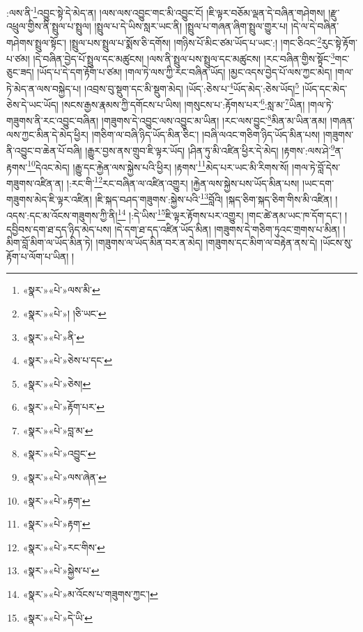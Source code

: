 :ལས་ནི་\footnote{«སྣར་»«པེ་»ལས་མི་}འབྱུང་སྟེ་དེ་མེད་ན། །ལས་ལས་འབྱུང་གང་མི་འབྱུང་ངོ། །ཇི་ལྟར་བཅོམ་ལྡན་དེ་བཞིན་གཤེགས། །རྫུ་འཕྲུལ་གྱིས་ནི་སྤྲུལ་པ་སྤྲུལ། །སྤྲུལ་པ་དེ་ཡིས་སླར་ཡང་ནི། །སྤྲུལ་པ་གཞན་ཞིག་སྤྲུལ་གྱུར་པ། །དེ་ལ་དེ་བཞིན་གཤེགས་སྤྲུལ་སྟོང་། །སྤྲུལ་པས་སྤྲུལ་པ་སྨོས་ཅི་དགོས། །གཉིས་པོ་མིང་ཙམ་ཡོད་པ་ཡང་:། །གང་ཅིའང་\footnote{«སྣར་»«པེ་»། །ཅི་ཡང་}རུང་སྟེ་རྟོག་པ་ཙམ། །དེ་བཞིན་བྱེད་པོ་སྤྲུལ་དང་མཚུངས། །ལས་ནི་སྤྲུལ་པས་སྤྲུལ་དང་མཚུངས། །རང་བཞིན་གྱིས་སྟོང་\footnote{«སྣར་»«པེ་»ནི་}གང་ཅུང་ཟད། །ཡོད་པ་དེ་དག་རྟོག་པ་ཙམ། །གལ་ཏེ་ལས་ཀྱི་རང་བཞིན་ཡོད། །མྱང་འདས་བྱེད་པོ་ལས་ཀྱང་མེད། །གལ་ཏེ་མེད་ན་ལས་བསྐྱེད་པ། །འབྲས་བུ་སྡུག་དང་མི་སྡུག་མེད། །ཡོད་:ཅེས་པ་\footnote{«སྣར་»«པེ་»ཅེས་པ་དང་}ཡོད་མེད་:ཅེས་ཡོད།\footnote{«སྣར་»«པེ་»ཅེས།} །ཡོད་དང་མེད་ཅེས་དེ་ཡང་ཡོད། །སངས་རྒྱས་རྣམས་ཀྱི་དགོངས་པ་ཡིས། །གསུངས་པ་:རྟོགས་པར་\footnote{«སྣར་»«པེ་»རྟོག་པར་}:སླ་མ་\footnote{«སྣར་»«པེ་»བླ་མ་}ཡིན། །གལ་ཏེ་གཟུགས་ནི་རང་འབྱུང་བཞིན། །གཟུགས་དེ་འབྱུང་ལས་འབྱུང་མ་ཡིན། །རང་ལས་བྱུང་\footnote{«སྣར་»«པེ་»འབྱུང་}མིན་མ་ཡིན་ནམ། །གཞན་ལས་ཀྱང་མིན་དེ་མེད་ཕྱིར། །གཅིག་ལ་བཞི་ཉིད་ཡོད་མིན་ཅིང་། །བཞི་ལའང་གཅིག་ཉིད་ཡོད་མིན་པས། །གཟུགས་ནི་འབྱུང་བ་ཆེན་པོ་བཞི། །རྒྱུར་བྱས་ནས་གྲུབ་ཇི་ལྟར་ཡོད། །ཤིན་ཏུ་མི་འཛིན་ཕྱིར་དེ་མེད། །རྟགས་:ལས་ཤེ་\footnote{«སྣར་»«པེ་»ལས་ཞེན་}ན་རྟགས་\footnote{«སྣར་»«པེ་»རྟག་}དེའང་མེད། །རྒྱུ་དང་རྐྱེན་ལས་སྐྱེས་པའི་ཕྱིར། །རྟགས་\footnote{«སྣར་»«པེ་»རྟག་}མེད་པར་ཡང་མི་རིགས་སོ། །གལ་ཏེ་བློ་དེས་གཟུགས་འཛིན་ན། །:རང་གི་\footnote{«སྣར་»«པེ་»རང་གིས་}རང་བཞིན་ལ་འཛིན་འགྱུར། །རྐྱེན་ལས་སྐྱེས་པས་ཡོད་མིན་པས། །ཡང་དག་གཟུགས་མེད་ཇི་ལྟར་འཛིན། །ཇི་སྐད་བཤད་གཟུགས་:སྐྱེས་པའི་\footnote{«སྣར་»«པེ་»སྐྱེས་པ་}བློའི། །སྐད་ཅིག་སྐད་ཅིག་གིས་མི་འཛིན། །འདས་:དང་མ་འོངས་གཟུགས་ཀྱི་ནི།\footnote{«སྣར་»«པེ་»མ་འོངས་པ་གཟུགས་ཀྱང་།} །:དེ་ཡིས་\footnote{«སྣར་»«པེ་»དེ་ཡི་}ཇི་ལྟར་རྟོགས་པར་འགྱུར། །གང་ཚེ་ནམ་ཡང་ཁ་དོག་དང་། །དབྱིབས་དག་ཐ་དད་ཉིད་མེད་པས། །དེ་དག་ཐ་དད་འཛིན་ཡོད་མིན། །གཟུགས་དེ་གཅིག་ཏུའང་གྲགས་པ་མིན། །མིག་བློ་མིག་ལ་ཡོད་མིན་ཏེ། །གཟུགས་ལ་ཡོད་མིན་བར་ན་མེད། །གཟུགས་དང་མིག་ལ་བརྟེན་ནས་དེ། །ཡོངས་སུ་རྟོག་པ་ལོག་པ་ཡིན། །
